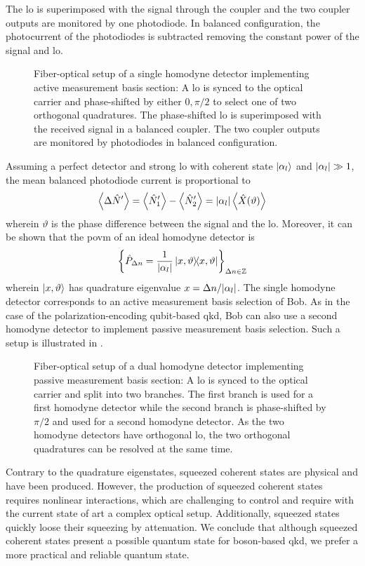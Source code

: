 The \gls{lo} is superimposed with the signal through the coupler and the two coupler outputs are monitored by one photodiode.
In balanced configuration, the photocurrent of the photodiodes is subtracted removing the constant power of the signal and \gls{lo}.
\begin{figure}[htb]
	\centering
	
	\caption{Fiber-optical setup of a single homodyne detector implementing active measurement basis section: A \gls{lo} is synced to the optical carrier and phase-shifted by either $0,\pi/2$ to select one of two orthogonal quadratures. The phase-shifted \gls{lo} is superimposed with the received signal in a balanced coupler. The two coupler outputs are monitored by photodiodes in balanced configuration.}\label{fig:coherent_receiver_active}
\end{figure}
Assuming a perfect detector and strong \gls{lo} with coherent state $\ket{\alpha_l}$ and $\abs{\alpha_l}\gg1$, the mean balanced photodiode current is proportional to~\cite[p.~217]{Vogel2006}
\begin{equation}
	\expval{\Delta\hat{N}^\prime}
	=
	\expval{\hat{N}_1^\prime}
	-
	\expval{\hat{N}_2^\prime}
	=
	\abs{\alpha_l}
	\expval{\hat{X}(\vartheta)}
\end{equation}
wherein $\vartheta$ is the phase difference between the signal and the \gls{lo}.
Moreover, it can be shown that the \gls{povm} of an ideal homodyne detector is~\cite[p.~220]{Vogel2006}
\begin{equation}
	\left\{\hat{P}_{\Delta n}=\frac{1}{\abs{\alpha_l}}\ketbra{x,\vartheta}\right\}_{\Delta n\in\mathbb{Z}}
\end{equation}
wherein $\ket{x,\vartheta}$ has quadrature eigenvalue $x=\Delta n/\abs{\alpha_l}$.
The single homodyne detector corresponds to an active measurement basis selection of Bob.
As in the case of the polarization-encoding qubit-based \gls{qkd}, Bob can also use a second homodyne detector to implement passive measurement basis selection.
Such a setup is illustrated in .
\begin{figure}[htb]
	\centering
	
	\caption{Fiber-optical setup of a dual homodyne detector implementing passive measurement basis section: A \gls{lo} is synced to the optical carrier and split into two branches. The first branch is used for a first homodyne detector while the second branch is phase-shifted by $\pi/2$ and used for a second homodyne detector. As the two homodyne detectors have orthogonal \gls{lo}, the two orthogonal quadratures can be resolved at the same time.}\label{fig:coherent_receiver_passive}
\end{figure}
Contrary to the quadrature eigenstates, squeezed coherent states are physical and have been produced.
However, the production of squeezed coherent states requires nonlinear interactions, which are challenging to control and require with the current state of art a complex optical setup.
Additionally, squeezed states quickly loose their squeezing by attenuation.
We conclude that although squeezed coherent states present a possible quantum state for boson-based \gls{qkd}, we prefer a more practical and reliable quantum state.

